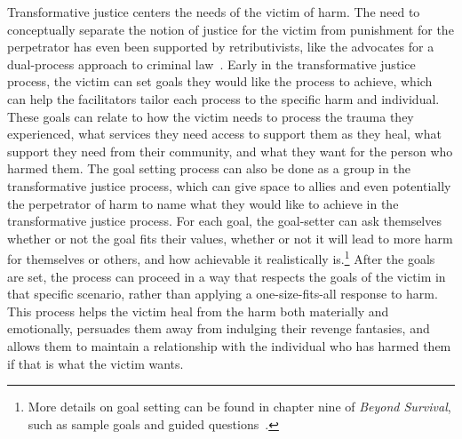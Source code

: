 \documentclass{article}
\begin{document}
        Transformative justice centers the needs of the victim of harm. The need to conceptually separate the notion of justice for the victim from punishment for the perpetrator has even been supported by retributivists, like the advocates for a dual-process approach to criminal law~\cite{dual-process}. Early in the transformative justice process, the victim can set goals they would like the process to achieve, which can help the facilitators tailor each process to the specific harm and individual. These goals can relate to how the victim needs to process the trauma they experienced, what services they need access to support them as they heal, what support they need from their community, and what they want for the person who harmed them. The goal setting process can also be done as a group in the transformative justice process, which can give space to allies and even potentially the perpetrator of harm to name what they would like to achieve in the transformative justice process. For each goal, the goal-setter can ask themselves whether or not the goal fits their values, whether or not it will lead to more harm for themselves or others, and how achievable it realistically is.\footnote{More details on goal setting can be found in chapter nine of \textit{Beyond Survival}, such as sample goals and guided questions~\cite{beyond-survival}.} After the goals are set, the process can proceed in a way that respects the goals of the victim in that specific scenario, rather than applying a one-size-fits-all response to harm. This process helps the victim heal from the harm both materially and emotionally, persuades them away from indulging their revenge fantasies, and allows them to maintain a relationship with the individual who has harmed them if that is what the victim wants. 
\end{document}
